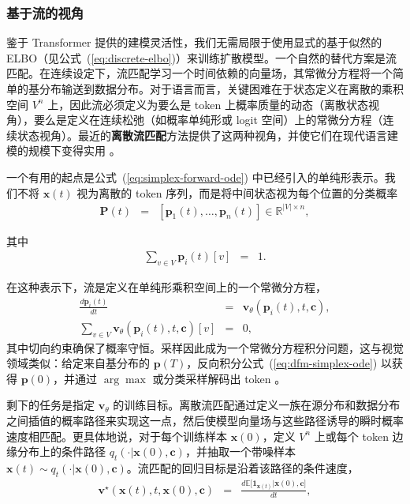 \subsubsection{基于流的视角}

鉴于 Transformer 提供的建模灵活性，我们无需局限于使用显式的基于似然的 ELBO（见公式~(\ref{eq:discrete-elbo})）来训练扩散模型。一个自然的替代方案是流匹配。在连续设定下，流匹配学习一个时间依赖的向量场，其常微分方程将一个简单的基分布输送到数据分布。对于语言而言，关键困难在于状态定义在离散的乘积空间 $V^n$ 上，因此流必须定义为要么是 token 上概率质量的动态（离散状态视角），要么是定义在连续松弛（如概率单纯形或 logit 空间）上的常微分方程（连续状态视角）。最近的\textbf{离散流匹配}方法提供了这两种视角，并使它们在现代语言建模的规模下变得实用 \citep{gat-etal:2024discrete,campbell-etal:2024generative,shaul-etal:2025flow}。

一个有用的起点是公式~(\ref{eq:simplex-forward-ode}) 中已经引入的单纯形表示。我们不将 $\mathbf{x}(t)$ 视为离散的 token 序列，而是将中间状态视为每个位置的分类概率
\begin{eqnarray}
\mathbf{P}(t) & = & [\mathbf{p}_1(t), \dots, \mathbf{p}_n(t)]
\in \mathbb{R}^{|V|\times n},
\end{eqnarray}

\noindent 其中
\begin{eqnarray}
\sum_{v\in V} \mathbf{p}_i(t)[v] & = &  1.
\end{eqnarray}

在这种表示下，流是定义在单纯形乘积空间上的一个常微分方程，
\begin{eqnarray}
\frac{d\mathbf{p}_i(t)}{dt} & = & \mathbf{v}_{\theta}(\mathbf{p}_i(t),t,\mathbf{c}), \\
\sum_{v\in V}\mathbf{v}_{\theta}(\mathbf{p}_i(t),t,\mathbf{c})[v] & = & 0,
\label{eq:dfm-simplex-ode}
\end{eqnarray}
其中切向约束确保了概率守恒。采样因此成为一个常微分方程积分问题，这与视觉领域类似：给定来自基分布的 $\mathbf{p}(T)$，反向积分公式~(\ref{eq:dfm-simplex-ode}) 以获得 $\mathbf{p}(0)$，并通过 $\arg\max$ 或分类采样解码出 token 。

剩下的任务是指定 $\mathbf{v}_\theta$ 的训练目标。离散流匹配通过定义一族在源分布和数据分布之间插值的概率路径来实现这一点，然后使模型向量场与这些路径诱导的瞬时概率速度相匹配。更具体地说，对于每个训练样本 $\mathbf{x}(0)$，定义 $V^n$ 上或每个 token 边缘分布上的条件路径 $q_t(\cdot | \mathbf{x}(0), \mathbf{c})$，并抽取一个带噪样本 $\mathbf{x}(t)\sim q_t(\cdot | \mathbf{x}(0), \mathbf{c})$。流匹配的回归目标是沿着该路径的条件速度，
\begin{eqnarray}
\mathbf{v}^\star(\mathbf{x}(t),t,\mathbf{x}(0),\mathbf{c})
& = &
\frac{d \mathbb{E}\big[\mathbf{1}_{\mathbf{x}(t)} | \mathbf{x}(0), \mathbf{c} \big]}{dt},
\label{eq:dfm-target-velocity}
\end{eqnarray}

